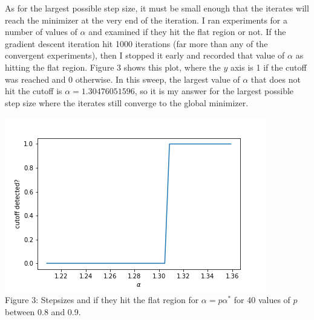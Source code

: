 \documentclass{letter}
\begin{document}
{    As for the largest possible step size, it must be small enough that the iterates will reach the minimizer at the very end of the iteration. I ran experiments for a number of values of $\alpha$ and examined if they hit the flat region or not. If the gradient descent iteration hit 1000 iterations (far more than any of the convergent experiments), then I stopped it early and recorded that value of $\alpha$ as hitting the flat region. Figure 3 shows this plot, where the $y$ axis is 1 if the cutoff was reached and 0 otherwise. In this sweep, the largest value of $\alpha$ that does not hit the cutoff is $\alpha = 1.30476051596$, so it is my answer for the largest possible step size where the iterates still converge to the global minimizer.
    \begin{center}
        \includegraphics[scale=0.77]{../pics/cutoffs.png} \\
        Figure 3: Stepsizes and if they hit the flat region for $\alpha = p\alpha^*$ for 40 values of $p$ between 0.8 and 0.9. 
    \end{center}

}
\end{document}
